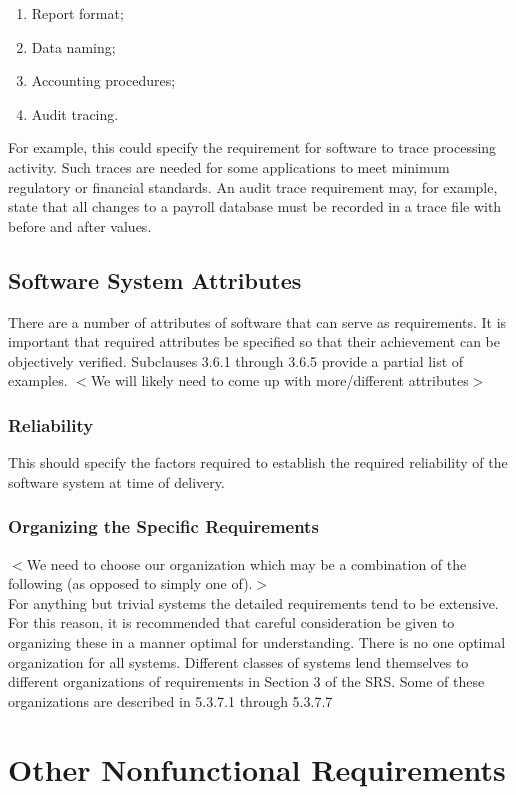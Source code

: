 \documentclass[draftclsnofoot,onecolumn,10pt]{IEEEtran}
\begin{document}
\begin{enumerate}
\begin{enumerate}
	\item Report format;
	\item Data naming;
	\item Accounting procedures;
	\item Audit tracing.
\end{enumerate}

For example, this could specify the requirement for software to trace processing
activity. Such traces are needed for some applications to meet minimum
regulatory or financial standards. An audit trace requirement may, for example,
state that all changes to a payroll database must be recorded in a trace file
with before and after values.

\subsection{Software System Attributes}
There are a number of attributes of software that can serve as requirements. It
is important that required attributes be specified so that their achievement can
be objectively verified. Subclauses 3.6.1 through 3.6.5 provide a partial list
of examples.
$<$We will likely need to come up with more/different attributes$>$

\subsubsection{Reliability}
This should specify the factors required to establish the required reliability
of the software system at time of delivery.

\subsubsection{Organizing the Specific Requirements}
$<$We need to choose our organization which may be a combination of the
following (as opposed to simply one of).$>$\\
For anything but trivial systems the detailed requirements tend to be extensive.
For this reason, it is recommended that careful consideration be given to
organizing these in a manner optimal for understanding. There is no one optimal
organization for all systems. Different classes of systems lend themselves to
different organizations of requirements in Section 3 of the SRS. Some of these
organizations are described in 5.3.7.1 through 5.3.7.7


\section{Other Nonfunctional Requirements}


\end{enumerate}
\end{document}
